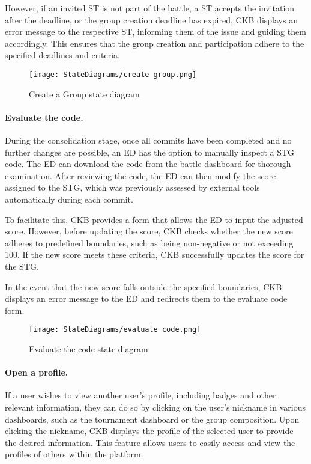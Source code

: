 However, if an invited ST is not part of the battle, a ST accepts the invitation after the deadline, or the group creation deadline has expired, CKB displays an error message to the respective ST, informing them of the issue and guiding them accordingly. This ensures that the group creation and participation adhere to the specified deadlines and criteria.

\begin{figure}[H]
    \begin{center}
        \texttt{[image: StateDiagrams/create group.png]}
        \caption{Create a Group state diagram}
        \label{fig:create_group_sd}%
    \end{center}
\end{figure}

\paragraph{Evaluate the code.}
During the consolidation stage, once all commits have been completed and no further changes are possible, an ED has the option to manually inspect a STG code. The ED can download the code from the battle dashboard for thorough examination. After reviewing the code, the ED can then modify the score assigned to the STG, which was previously assessed by external tools automatically during each commit.

To facilitate this, CKB provides a form that allows the ED to input the adjusted score. However, before updating the score, CKB checks whether the new score adheres to predefined boundaries, such as being non-negative or not exceeding 100. If the new score meets these criteria, CKB successfully updates the score for the STG.

In the event that the new score falls outside the specified boundaries, CKB displays an error message to the ED and redirects them to the evaluate code form.

\begin{figure}[H]
    \begin{center}
        \texttt{[image: StateDiagrams/evaluate code.png]}
        \caption{Evaluate the code state diagram}
        \label{fig:evaluate_code_sd}%
    \end{center}
\end{figure}

\paragraph{Open a profile.}
If a user wishes to view another user's profile, including badges and other relevant information, they can do so by clicking on the user's nickname in various dashboards, such as the tournament dashboard or the group composition. Upon clicking the nickname, CKB displays the profile of the selected user to provide the desired information. This feature allows users to easily access and view the profiles of others within the platform.

